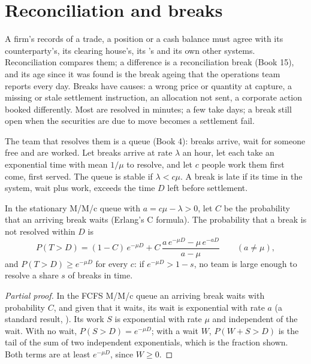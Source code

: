 \section{Reconciliation and breaks}

A firm's records of a trade, a position or a cash balance must agree with its counterparty's, its clearing house's, its 's and its own
other systems. Reconciliation compares them; a difference is a reconciliation break (Book 15), and its age since it was found is the break ageing
that the operations team reports every day. Breaks have causes: a wrong price or quantity at capture, a missing or stale settlement instruction, an
allocation not sent, a corporate action booked differently. Most are resolved in minutes; a few take days; a break still open when the securities
are due to move becomes a settlement fail.

The team that resolves them is a queue (Book 4): breaks arrive, wait for someone free and are worked. Let breaks arrive at rate $\lambda$ an hour,
let each take an exponential time with mean $1/\mu$ to resolve, and let $c$ people work them first come, first served. The queue is stable if
$\lambda<c\mu$. A break is late if its time in the system, wait plus work, exceeds the time $D$ left before settlement.

\begin{proposition}\label{prop:fm:operations:late}
In the stationary M/M/c queue with $a=c\mu-\lambda>0$, let $C$ be the probability that an arriving break waits (Erlang's C formula). The
probability that a break is not resolved within $D$ is
\[
P(T>D)=(1-C)\,e^{-\mu D}+C\,\frac{a\,e^{-\mu D}-\mu\,e^{-aD}}{a-\mu}\qquad(a\neq\mu),
\]
and $P(T>D)\ge e^{-\mu D}$ for every $c$: if $e^{-\mu D}>1-s$, no team is large enough to resolve a share $s$ of breaks in time.
\end{proposition}

\begin{proof}[Partial proof]
In the FCFS M/M/c queue an arriving break waits with probability $C$, and given that it waits, its wait is exponential with rate $a$ (a standard
result, \admitted). Its work $S$ is exponential with rate $\mu$ and independent of the wait. With no wait, $P(S>D)=e^{-\mu D}$; with a wait $W$,
$P(W+S>D)$ is the tail of the sum of two independent exponentials, which is the fraction shown. Both terms are at least $e^{-\mu D}$, since
$W\ge0$.
\end{proof}

